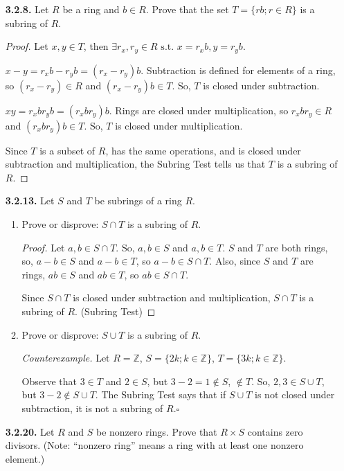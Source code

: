 \documentclass[12pt]{article}
\newcommand{\zee}{\mathbb{Z}}
\newcommand{\such}{\text{ s.t. }}
\begin{document}
\begin{itemize}
\item[\textbf{ 3.2.8.}] Let $R$ be a ring and $b\in R$. Prove that the set $T=\{rb; r\in R\}$ is a subring of $R$.

\begin{proof}
Let $x, y \in T$, then $\exists r_x, r_y \in R \such x=r_x b, y=r_y b$.
\par
$x-y = r_x b - r_y b = (r_x - r_y)b$.
Subtraction is defined for elements of a ring, so $(r_x - r_y) \in R$ and $(r_x - r_y)b \in T$.
So, $T$ is closed under subtraction.
\par
$xy = r_x b r_y b = (r_x b r_y) b$.
Rings are closed under multiplication, so $r_x b r_y \in R$ and $(r_x b r_y) b \in T$.
So, $T$ is closed under multiplication.
\par
Since $T$ is a subset of $R$, has the same operations, and is closed under subtraction and multiplication, the Subring Test tells us that $T$ is a subring of $R$.
\end{proof}


\item[\textbf{ 3.2.13.}] Let $S$ and $T$ be subrings of a ring $R$.

\begin{enumerate}[(a.)]
\item Prove or disprove: $S\cap T$ is a subring of $R$.

\begin{proof}
Let $a,b\in S\cap T$.
So, $a,b\in S$ and $a,b\in T$.
$S$ and $T$ are both rings, so, $a-b \in S$ and $a-b \in T$, so $a-b \in S \cap T$.
Also, since $S$ and $T$ are rings, $ab \in S$ and $ab \in T$, so $ab \in S \cap T$.
\par
Since $S \cap T$ is closed under subtraction and multiplication, $S \cap T$ is a subring of $R$. (Subring Test)
\end{proof}

\item Prove or disprove: $S\cup T$ is a subring of $R$.

\textit{Counterexample.}
Let $R = \zee$, $S = \{2k; k \in {\zee}\}$, $T = \{3k; k \in {\zee}\}$.
\par
Observe that $3 \in T$ and $2 \in S$, but $3-2=1 \not\in S$, $\not\in T$.
So, $2, 3 \in S \cup T$, but $3-2 \not\in S \cup T$.
The Subring Test says that if $S \cup T$ is not closed under subtraction, it is not a subring of $R$.{$\square$}
\end{enumerate}

\item[\textbf{ 3.2.20.}] Let $R$ and $S$ be nonzero rings. Prove that $R\times S$ contains zero divisors. (Note: ``nonzero ring'' means a ring with at least one nonzero element.)


\end{itemize}
\end{document}
